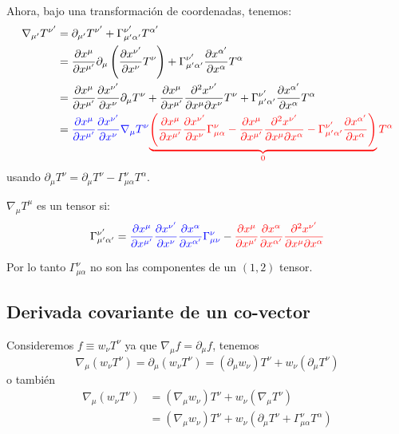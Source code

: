\documentclass[../main]{subfiles}
\begin{document}
Ahora, bajo una transformación de coordenadas, tenemos:
\begin{equation}
    \begin{split}
        \nabla_{\mu'}T^{\nu'}&=\partial_{\mu'}T^{\nu'}+\Gamma^{\nu'}_{\mu'\alpha'}T^{\alpha'}\\
        &=\pdv{x^{\mu}}{x^{\mu'}}\partial_{\mu}\left(\pdv{x^{\nu'}}{x^{\nu}}T^{\nu}\right)+\Gamma^{\nu'}_{\mu'\alpha'}\pdv{x^{\alpha'}}{x^{\alpha}} T^{\alpha} \\
        &=\pdv{x^{\mu}}{x^{\mu'}}\pdv{x^{\nu'}}{x^{\nu}} \partial_{\mu}T^{\nu}+\pdv{x^{\mu}}{x^{\mu'}}\pdv{x^{\nu'}}{x^{\mu}}{x^{\nu}} T^{\nu}+\Gamma^{\nu'}_{\mu'\alpha'}\pdv{x^{\alpha'}}{x^{\alpha}} T^{\alpha} \\
        &=\textcolor{blue}{\pdv{x^{\mu}}{x^{\mu'}}\pdv{x^{\nu'}}{x^{\nu}}\nabla_{\mu}T^{\nu}} \textcolor{red}{\underbrace{\left(\pdv{x^{\mu}}{x^{\mu'}}\pdv{x^{\nu'}}{x^{\nu}}\Gamma^{\nu}_{\mu\alpha}-\pdv{x^{\mu}}{x^{\mu'}}\pdv{x^{\nu'}}{x^{\mu}}{x^{\alpha}}-\Gamma^{\nu'}_{\mu'\alpha'}\pdv{x^{\alpha'}}{x^{\alpha}}\right)}_{0}T^{\alpha}}
    \end{split}
\end{equation}
usando $\partial_{\mu}T^{\nu}=\partial_{\mu} T^{\nu}-\Gamma^{\nu}_{\mu\alpha}T^{\alpha}$.

$\nabla_{\mu}T^{\mu}$ es un tensor si:
\begin{equation}
    \Gamma^{\nu'}_{\mu'\alpha'}=\textcolor{blue}{\pdv{x^{\mu}}{x^{\mu'}}\pdv{x^{\nu'}}{x^{\nu}}\pdv{x^{\alpha}}{x^{\alpha'}}\Gamma^{\nu}_{\mu\nu}}-\textcolor{red}{\pdv{x^{\mu}}{x^{\mu'}}\pdv{x^{\alpha}}{x^{\alpha'}}\pdv{x^{\nu'}}{x^{\mu}}{x^{\alpha}}}
\end{equation}

Por lo tanto $\Gamma^{\nu}_{\mu\alpha}$ no son las componentes de un $(1, 2)$ tensor.

\subsection{Derivada covariante de un co-vector}

Consideremos $f\equiv w_{\nu}T^{\nu}$ ya que $\nabla_{\mu}f=\partial_{\mu} f$, tenemos 
\begin{equation}
    \nabla_{\mu}(w_{\nu}T^{\nu})=\partial_{\mu}(w_{\nu}T^{\nu})=(\partial_{\mu}w_{\nu})T^{\nu}+w_{\nu}(\partial_{\mu}T^{\nu})
\end{equation}
o también
\begin{equation}
    \begin{split}
        \nabla_{\mu}(w_{\nu}T^{\nu})&=(\nabla_{\mu}w_{\nu})T^{\nu}+w_{\nu}(\nabla_{\mu}T^{\nu})\\
        &=(\nabla_{\mu}w_{\nu})T^{\nu}+w_{\nu}(\partial_{\mu}T^{\nu}+\Gamma^{\nu}_{\mu\alpha}T^{\alpha})
    \end{split}
\end{equation}
\end{document}
